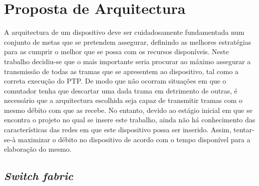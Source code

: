 
\chapter{Proposta de Arquitectura}
\label{chapter:results}

A arquitectura de um dispositivo deve ser cuidadosamente fundamentada num conjunto de metas que se pretendem assegurar, definindo as melhores estratégias para as cumprir o melhor que se possa com os recursos disponíveis. Neste trabalho decidiu-se que o mais importante seria procurar ao máximo assegurar a transmissão de todas as tramas que se apresentem ao dispositivo, tal como a correta execução do PTP. De modo que não ocorram situações em que o comutador tenha que descartar uma dada trama em detrimento de outras, é necessário que a arquitectura escolhida seja capaz de transmitir tramas com o mesmo débito com que as recebe. No entanto, devido ao estágio inicial em que se encontra o projeto no qual se insere este trabalho, ainda não há conhecimento das características das redes em que este dispositivo possa ser inserido. Assim, tentar-se-à maximizar o débito no dispositivo de acordo com o tempo disponível para a elaboração do mesmo. 


\section{\textit{Switch fabric}}


